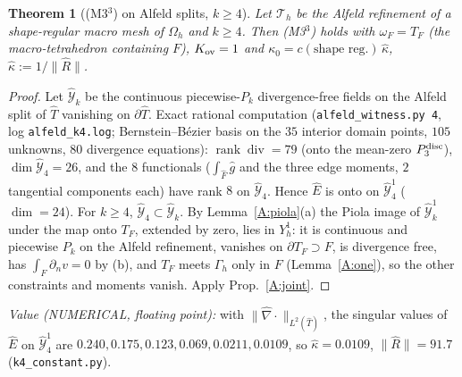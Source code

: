 \documentclass[11pt]{article}
\newtheorem{theorem}{Theorem}[section]
\theoremstyle{definition}
\newcommand{\Gh}{\Gamma_h}
\newcommand{\Oh}{\Omega_h}
\newcommand{\Th}{\mathcal T_h}
\newcommand{\dn}{\partial_n}
\newcommand{\norm}[1]{\lVert #1\rVert}
\renewcommand{\div}{\operatorname{div}}
\begin{document}
\begin{theorem}[(M3$^3$) on Alfeld splits, $k\ge4$]\label{A:alfeld}
Let $\Th$ be the Alfeld refinement of a shape-regular macro mesh of $\Oh$ and $k\ge4$. Then (M3$^3$) holds with $\omega_F=T_F$ (the macro-tetrahedron containing $F$), $K_{\rm ov}=1$ and $\kappa_0=c(\text{shape reg.})\,\hat\kappa$, $\hat\kappa:=1/\norm{\hat R}$.
\end{theorem}
\begin{proof}
Let $\hat{\mathcal Y}_k$ be the continuous piecewise-$P_k$ divergence-free fields on the Alfeld split of $\hat T$ vanishing on $\partial\hat T$. Exact rational computation (\texttt{alfeld\_witness.py 4}, log \texttt{alfeld\_k4.log}; Bernstein--B\'ezier basis on the $35$ interior domain points, $105$ unknowns, $80$ divergence equations): $\operatorname{rank}\div=79$ (onto the mean-zero $P_3^{\rm disc}$), $\dim\hat{\mathcal Y}_4=26$, and the $8$ functionals ($\int_{\hat F}\hat g$ and the three edge moments, $2$ tangential components each) have rank $8$ on $\hat{\mathcal Y}_4$. Hence $\hat E$ is onto on $\hat{\mathcal Y}_4^1$ ($\dim=24$). For $k\ge4$, $\hat{\mathcal Y}_4\subset\hat{\mathcal Y}_k$. By Lemma~\ref{A:piola}(a) the Piola image of $\hat{\mathcal Y}^1_k$ under the map onto $T_F$, extended by zero, lies in $Y_h^1$: it is continuous and piecewise $P_k$ on the Alfeld refinement, vanishes on $\partial T_F\supset F$, is divergence free, has $\int_F\dn v=0$ by (b), and $T_F$ meets $\Gh$ only in $F$ (Lemma~\ref{A:one}), so the other constraints and moments vanish. Apply Prop.~\ref{A:joint}.
\end{proof}
\emph{Value (NUMERICAL, floating point):} with $\norm{\hat\nabla\cdot}_{L^2(\hat T)}$, the singular values of $\hat E$ on $\hat{\mathcal Y}^1_4$ are $0.240,0.175,0.123,0.069,0.0211,0.0109$, so $\hat\kappa=0.0109$, $\norm{\hat R}=91.7$ (\texttt{k4\_constant.py}).
\end{document}
